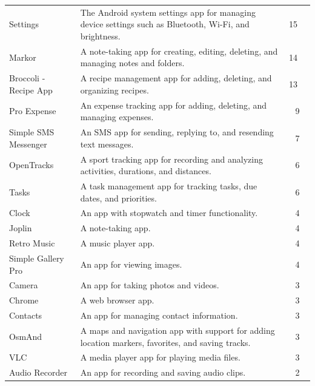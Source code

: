 \documentclass{article}
\begin{document}
\begin{appendices}
\begin{table}
{\begin{tabular}{lp{10cm}c}
    Settings & The Android system settings app for managing device settings such as Bluetooth, Wi-Fi, and brightness. & 15~~ \\
   
    Markor & A note-taking app for creating, editing, deleting, and managing notes and folders. & 14~~ \\

    Broccoli - Recipe App & A recipe management app for adding, deleting, and organizing recipes. & 13~~ \\
  
    Pro Expense & An expense tracking app for adding, deleting, and managing expenses. & 9 \\
  
    Simple SMS Messenger & An SMS app for sending, replying to, and resending text messages. & 7 \\
  
    OpenTracks & A sport tracking app for recording and analyzing activities, durations, and distances. & 6 \\

    Tasks & A task management app for tracking tasks, due dates, and priorities. & 6 \\

    Clock & An app with stopwatch and timer functionality. & 4 \\

    Joplin & A note-taking app. & 4 \\

    Retro Music & A music player app. & 4 \\
 
    Simple Gallery Pro & An app for viewing images. & 4 \\

    Camera & An app for taking photos and videos. & 3 \\
 
    Chrome & A web browser app. & 3 \\

    Contacts & An app for managing contact information. & 3 \\

    OsmAnd & A maps and navigation app with support for adding location markers, favorites, and saving tracks. & 3 \\

    VLC & A media player app for playing media files. & 3 \\

    Audio Recorder & An app for recording and saving audio clips. & 2 \\
  

\end{tabular}}
\end{table}
\end{appendices}
\end{document}
